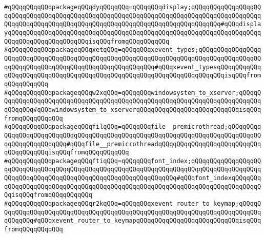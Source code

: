 \verb|#qQQqqQQqqQQqpackageqQQqdyqQQqqQQq=qQQqqQQqdisplay;qQQqqQQqqQQqqQQqqQQqqQQqqQQqqQQqqQQqqQQqqQQqqQQqqQQqqQQqqQQqqQQqqQQqqQQqqQQqqQQqqQQqqQQqqQQqqQQqqQQqqQQqqQQqqQQqqQQqqQQqqQQqqQQqqQQqqQQqqQQqqQQqqQQq#qQQqdisplayqQQqqQQqqQQqqQQqqQQqqQQqqQQqqQQqqQQqqQQqqQQqqQQqqQQqqQQqqQQqqQQqqQQqqQQqqQQqqQQqqQQqqQQqqQQqisqQQqfromqQQqqQQqqQQq|\newline
\verb|#qQQqqQQqqQQqpackageqQQqxetqQQq=qQQqqQQqxevent_types;qQQqqQQqqQQqqQQqqQQqqQQqqQQqqQQqqQQqqQQqqQQqqQQqqQQqqQQqqQQqqQQqqQQqqQQqqQQqqQQqqQQqqQQqqQQqqQQqqQQqqQQqqQQqqQQqqQQqqQQqqQQqqQQq#qQQqxevent_typesqQQqqQQqqQQqqQQqqQQqqQQqqQQqqQQqqQQqqQQqqQQqqQQqqQQqqQQqqQQqqQQqqQQqqQQqisqQQqfromqQQqqQQqqQQq|\newline
\verb|#qQQqqQQqqQQqpackageqQQqw2xqQQq=qQQqqQQqwindowsystem_to_xserver;qQQqqQQqqQQqqQQqqQQqqQQqqQQqqQQqqQQqqQQqqQQqqQQqqQQqqQQqqQQqqQQqqQQqqQQqqQQqqQQqqQQq#qQQqwindowsystem_to_xserverqQQqqQQqqQQqqQQqqQQqqQQqqQQqisqQQqfromqQQqqQQqqQQq|\newline
\verb|#qQQqqQQqqQQqpackageqQQqfilqQQq=qQQqqQQqfile__premicrothread;qQQqqQQqqQQqqQQqqQQqqQQqqQQqqQQqqQQqqQQqqQQqqQQqqQQqqQQqqQQqqQQqqQQqqQQqqQQqqQQqqQQqqQQqqQQqqQQq#qQQqfile__premicrothreadqQQqqQQqqQQqqQQqqQQqqQQqqQQqqQQqqQQqqQQqisqQQqfromqQQqqQQqqQQq|\newline
\verb|#qQQqqQQqqQQqpackageqQQqftiqQQq=qQQqqQQqfont_index;qQQqqQQqqQQqqQQqqQQqqQQqqQQqqQQqqQQqqQQqqQQqqQQqqQQqqQQqqQQqqQQqqQQqqQQqqQQqqQQqqQQqqQQqqQQqqQQqqQQqqQQqqQQqqQQqqQQqqQQqqQQqqQQqqQQqqQQq#qQQqfont_indexqQQqqQQqqQQqqQQqqQQqqQQqqQQqqQQqqQQqqQQqqQQqqQQqqQQqqQQqqQQqqQQqqQQqqQQqqQQqqQQqisqQQqfromqQQqqQQqqQQq|\newline
\verb|#qQQqqQQqqQQqpackageqQQqr2kqQQq=qQQqqQQqxevent_router_to_keymap;qQQqqQQqqQQqqQQqqQQqqQQqqQQqqQQqqQQqqQQqqQQqqQQqqQQqqQQqqQQqqQQqqQQqqQQqqQQqqQQqqQQq#qQQqxevent_router_to_keymapqQQqqQQqqQQqqQQqqQQqqQQqqQQqisqQQqfromqQQqqQQqqQQq|\newline
